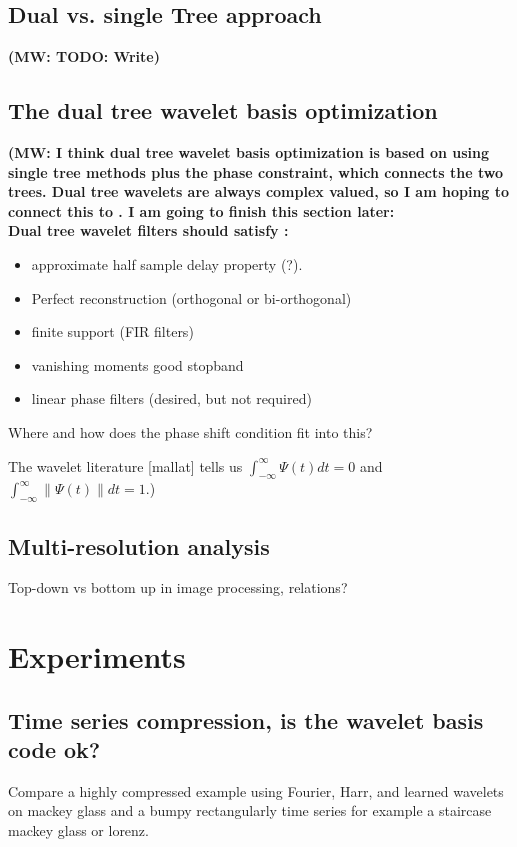\documentclass{article}
\newcommand{\MW}[1]{{\color{blue} {\bf (MW: #1)}}}
\begin{document}
\subsection{Dual vs. single Tree approach}
\MW{TODO: Write}

\subsection{The dual tree wavelet basis optimization}
\MW{I think dual tree wavelet basis optimization is based on using single tree methods plus the phase constraint, which connects the two trees. Dual tree wavelets are always complex valued, so I am hoping to connect this to \cite{wolter-2018-neurips}. I am going to finish this section later: \\
Dual tree wavelet filters should satisfy \cite{Selesnick2005}:
\begin{itemize}
\item approximate half sample delay property (?).
\item Perfect reconstruction (orthogonal or bi-orthogonal)
\item finite support (FIR filters)
\item vanishing moments good stopband
\item linear phase filters (desired, but not required)
\end{itemize}

Where and how does the phase shift condition fit into this?

The wavelet literature [mallat] tells us $\int_{-\infty}^{\infty} \Psi(t) dt = 0$
and $\int_{-\infty}^{\infty} \| \Psi(t) \| dt = 1$.}


\subsection{Multi-resolution analysis}
Top-down vs bottom up in image processing, relations?


\section{Experiments}
\subsection{Time series compression, is the wavelet basis code ok?}
Compare a highly compressed example using Fourier, Harr, and learned wavelets on mackey glass and a bumpy rectangularly time series for example a staircase mackey glass or lorenz. \\
\end{document}
